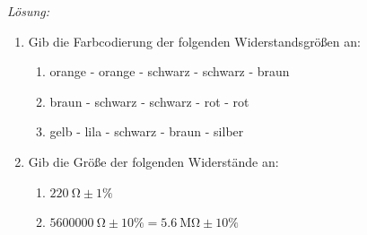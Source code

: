 \documentclass[ngerman, 11pt]{scrreprt}
\begin{document}
	\bigskip
	\emph{Lösung:}
	
	\begin{enumerate}[label=\alph*), itemsep=0ex]
		\item Gib die Farbcodierung der folgenden Widerstandsgrößen an:
		\begin{multicols}{3}
			\begin{enumerate}[label=(\arabic*)]
				\item orange - orange - schwarz - schwarz - braun
				\item braun - schwarz - schwarz - rot - rot
				\item gelb - lila - schwarz - braun - silber
			\end{enumerate}
		\end{multicols}
		\item Gib die Größe der folgenden Widerstände an:
		\begin{multicols}{2}
			\begin{enumerate}[label=(\arabic*)]
				\item $\SI{220}{\ohm} \pm 1\%$
				\item $\SI{5600000}{\ohm} \pm 10\% = \SI{5,6}{\mega\ohm} \pm 10\%$
			\end{enumerate}
		\end{multicols}
	\end{enumerate}
	
\end{document}

